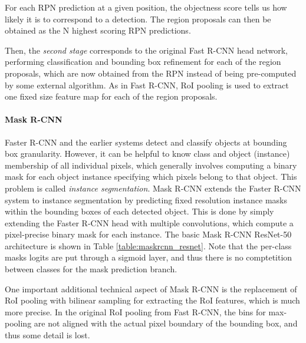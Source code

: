 For each RPN prediction at a given position, the objectness score tells us how likely it is to correspond to a detection.
The region proposals can then be obtained as the N highest scoring RPN predictions.

Then, the \emph{second stage} corresponds to the original Fast R-CNN head network, performing classification
and bounding box refinement for each of the region proposals, which are now obtained
from the RPN instead of being pre-computed by some external algorithm.
As in Fast R-CNN, RoI pooling is used to extract one fixed size feature map for each of the region proposals.

\paragraph{Mask R-CNN}
Faster R-CNN and the earlier systems detect and classify objects at bounding box granularity.
However, it can be helpful to know class and object (instance) membership of all individual pixels,
which generally involves computing a binary mask for each object instance specifying which pixels belong
to that object. This problem is called \emph{instance segmentation}.
Mask R-CNN \cite{MaskRCNN} extends the Faster R-CNN system to instance segmentation by predicting
fixed resolution instance masks within the bounding boxes of each detected object.
This is done by simply extending the Faster R-CNN head with multiple convolutions, which
compute a pixel-precise binary mask for each instance.
The basic Mask R-CNN ResNet-50 architecture is shown in Table \ref{table:maskrcnn_resnet}.
Note that the per-class masks logits are put through a sigmoid layer, and thus there is no
comptetition between classes for the mask prediction branch.

One important additional technical aspect of Mask R-CNN is the replacement of RoI pooling with
bilinear sampling for extracting the RoI features, which is much more precise.
In the original RoI pooling from Fast R-CNN, the bins for max-pooling are not aligned with the actual pixel
boundary of the bounding box, and thus some detail is lost.


